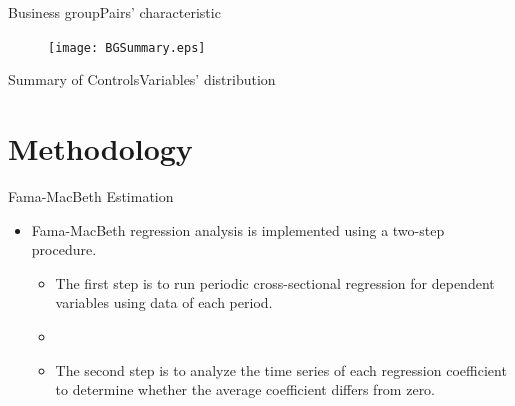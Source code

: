 \documentclass{beamer}
\begin{document}
	\begin{frame}{Business group}{Pairs' characteristic}
		\begin{figure}[htbp]
			\texttt{[image: BGSummary.eps]}
			
		\end{figure}
	\end{frame}
	
	
	
	
	\begin{frame}{Summary of Controls}{Variables' distribution } \label{Monthly2}

		
		\begin{table}[htbp]
			\centering 
			\scriptsize
			{
				
			}
		\end{table}
		
		
	\end{frame}
	
	
	\section{Methodology}
	
	\begin{frame}{Fama-MacBeth Estimation}
		\begin{itemize}
			\item Fama-MacBeth regression analysis is implemented using a two-step procedure. 
			\begin{itemize}
				\item The first step is to
				run periodic cross-sectional regression for dependent variables using data of each period.
				\item[]
				\item
				The second step is to analyze the time series
				of each regression coefficient to determine whether the average coefficient differs from zero.
			\end{itemize}
			
		\end{itemize}
	\end{frame}
	
\end{document}
